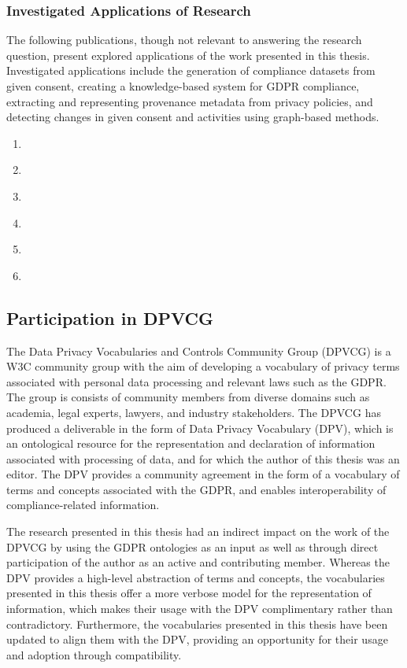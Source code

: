 \subsubsection{Investigated Applications of Research}
The following publications, though not relevant to answering the research question, present explored applications of the work presented in this thesis. Investigated applications include the generation of compliance datasets from given consent, creating a knowledge-based system for GDPR compliance, extracting and representing provenance metadata from privacy policies, and detecting changes in given consent and activities using graph-based methods.
\begin{enumerate}[resume]
    \item \textbf{}
    \item \textbf{}
    \item \textbf{}
    \item \textbf{}
    \item \textbf{}
    \item \textbf{}
\end{enumerate}

\subsection{Participation in DPVCG}
The Data Privacy Vocabularies and Controls Community Group (DPVCG) is a W3C community group with the aim of developing a vocabulary of privacy terms associated with personal data processing and relevant laws such as the GDPR. The group is consists of community members from diverse domains such as academia, legal experts, lawyers, and industry stakeholders. The DPVCG has produced a deliverable in the form of Data Privacy Vocabulary (DPV), which is an ontological resource for the representation and declaration of information associated with processing of data, and for which the author of this thesis was an editor. The DPV provides a community agreement in the form of a vocabulary of terms and concepts associated with the GDPR, and enables interoperability of compliance-related information.

The research presented in this thesis had an indirect impact on the work of the DPVCG by using the GDPR ontologies as an input as well as through direct participation of the author as an active and contributing member. Whereas the DPV provides a high-level abstraction of terms and concepts, the vocabularies presented in this thesis offer a more verbose model for the representation of information, which makes their usage with the DPV complimentary rather than contradictory. Furthermore, the vocabularies presented in this thesis have been updated to align them with the DPV, providing an opportunity for their usage and adoption through compatibility.

